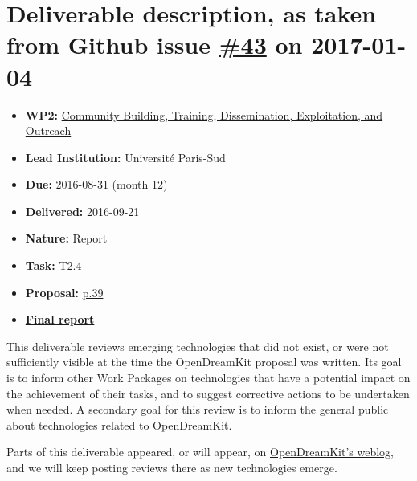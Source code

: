 \section*{\texorpdfstring{Deliverable description, as taken from Github
issue
\href{https://github.com/OpenDreamKit/OpenDreamKit/issues/43}{\#43} on
2017-01-04}{Deliverable description, as taken from Github issue \#43 on 2017-01-04}}\label{deliverable-description-as-taken-from-github-issue-43-on-2017-01-04}

\begin{itemize}
\tightlist
\item
  \textbf{WP2:}
  \href{https://github.com/OpenDreamKit/OpenDreamKit/tree/master/WP2}{Community
  Building, Training, Dissemination, Exploitation, and Outreach}
\item
  \textbf{Lead Institution:} Université Paris-Sud
\item
  \textbf{Due:} 2016-08-31 (month 12)
\item
  \textbf{Delivered:} 2016-09-21
\item
  \textbf{Nature:} Report
\item
  \textbf{Task:}
  \href{https://github.com/OpenDreamKit/OpenDreamKit/issues/27}{T2.4}
\item
  \textbf{Proposal:}
  \href{https://github.com/OpenDreamKit/OpenDreamKit/raw/master/Proposal/proposal-www.pdf}{p.39}
\item
  \textbf{\href{https://github.com/OpenDreamKit/OpenDreamKit/raw/master/WP2/D2.3/report-final.pdf}{Final
  report}}
\end{itemize}

This deliverable reviews emerging technologies that did not exist, or
were not sufficiently visible at the time the OpenDreamKit proposal was
written. Its goal is to inform other Work Packages on technologies that
have a potential impact on the achievement of their tasks, and to
suggest corrective actions to be undertaken when needed. A secondary
goal for this review is to inform the general public about technologies
related to OpenDreamKit.

Parts of this deliverable appeared, or will appear, on
\href{http://opendreamkit.org}{OpenDreamKit's weblog}, and we will keep
posting reviews there as new technologies emerge.
